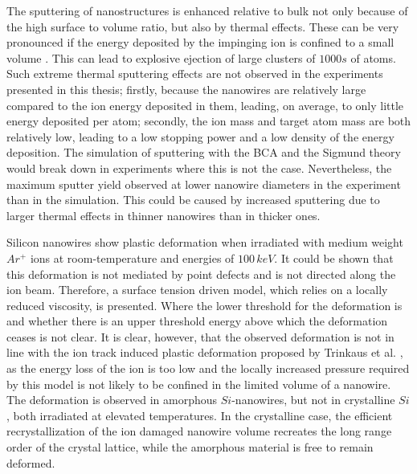 The sputtering of nanostructures is enhanced relative to bulk not only because of the high surface to volume ratio, but also by thermal effects. These can be very pronounced if the energy deposited by the impinging ion is confined to a small volume \cite{greaves_enhanced_2013,ilinov_sputtering_2014,nietiadi_sputtering_2014,anders_sputtering_2015,urbassek_sputter_2015}. This can lead to explosive ejection of large clusters of $1000s$ of atoms. Such extreme thermal sputtering effects are not observed in the experiments presented in this thesis; firstly, because the nanowires are relatively large compared to the ion energy deposited in them, leading, on average, to only little energy deposited per atom; secondly, the ion mass and target atom mass are both relatively low, leading to a low stopping power and a low density of the energy deposition. The simulation of sputtering with the BCA and the Sigmund theory would break down in experiments where this is not the case. Nevertheless, the maximum sputter yield observed at lower nanowire diameters in the experiment than in the simulation. This could be caused by increased sputtering due to larger thermal effects in thinner nanowires than in thicker ones.

Silicon nanowires show plastic deformation when irradiated with medium weight $Ar^+$ ions at room-temperature and energies of $100\,keV$. It could be shown that this deformation is not mediated by point defects and is not directed along the ion beam. Therefore, a surface tension driven model, which relies on a locally reduced viscosity, is presented. Where the lower threshold for the deformation is and whether there is an upper threshold energy above which the deformation ceases is not clear. It is clear, however, that the observed deformation is not in line with the ion track induced plastic deformation proposed by Trinkaus et al. \cite{trinkaus_viscoelastic_1995}, as the energy loss of the ion is too low and the locally increased pressure required by this model is not likely to be confined in the limited volume of a nanowire. The deformation is observed in amorphous $Si$-nanowires, but not in crystalline $Si$, both irradiated at elevated temperatures. In the crystalline case, the efficient recrystallization of the ion damaged nanowire volume recreates the long range order of the crystal lattice, while the amorphous material is free to remain deformed.

